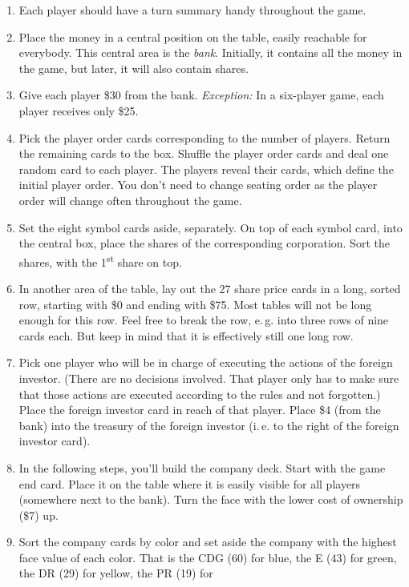 \documentclass[10pt,final]{report}
\begin{document}
\begin{multicols}{2}
\begin{enumerate}
\item Each player should have a turn summary handy throughout the
  game.
\item Place the money in a central position on the table, easily
  reachable for everybody. This central area is the
  \emph{bank}. Initially, it contains all the money in the game, but
  later, it will also contain shares.
\item Give each player \$30 from the bank. \emph{Exception:} In a
  six-player game, each player receives only \$25.
\item Pick the player order cards corresponding to the number of
  players. Return the remaining cards to the box. Shuffle the player
  order cards and deal one random card to each player. The players
  reveal their cards, which define the initial player order. You don't
  need to change seating order as the player order will change often
  throughout the game.
\item Set the eight symbol cards aside, separately. On top of each
  symbol card, into the central box, place the shares of the
  corresponding corporation. Sort the shares, with the
  1\textsuperscript{st} share on top.
\item In another area of the table, lay out the 27 share price cards in a
  long, sorted row, starting with \$0 and ending with \$75. Most
  tables will not be long enough for this row. Feel free to break the
  row, e.\,g. into three rows of nine cards each. But keep in mind
  that it is effectively still one long row.
\item Pick one player who will be in charge of executing the actions
  of the foreign investor. (There are no decisions involved. That
  player only has to make sure that those actions are executed
  according to the rules and not forgotten.) Place the foreign
  investor card in reach of that player. Place \$4 (from the bank)
  into the treasury of the foreign investor (i.\,e. to the right of
  the foreign investor card).
\item In the following steps, you'll build the company deck. Start
  with the game end card. Place it on the table where it is easily
  visible for all players (somewhere next to the bank). Turn the face
  with the lower cost of ownership (\$7) up.
\item Sort the company cards by color and set aside the company with
  the highest face value of each color. That is the CDG (60) for blue,
  the E (43) for green, the DR (29) for yellow, the PR (19) for

\end{enumerate}
\end{multicols}
\end{document}
